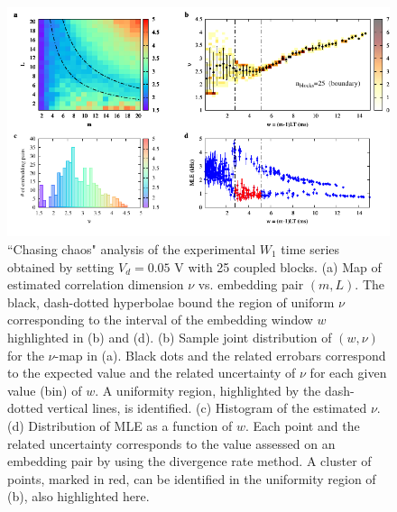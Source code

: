\begin{figure}[H]
    \centering
    \includegraphics[width=\linewidth]{../blocks/25_blocks/edge/2e5_points/plots/chaos_low.pdf}
    \caption{``Chasing chaos" analysis of the experimental $W_1$ time series obtained by setting $V_d=0.05$ V with 25 coupled blocks.
    (a) Map of estimated correlation dimension $\nu$ vs. embedding pair $(m, L)$.
    The black, dash-dotted hyperbolae bound the region of uniform $\nu$ corresponding to the interval of the
    embedding window $w$ highlighted in (b) and (d).
    (b) Sample joint distribution of $(w,\nu)$ for the $\nu$-map in (a).
    Black dots and the related errobars correspond to the expected value and the related uncertainty of $\nu$
    for each given value (bin) of $w$. A uniformity region, highlighted by the dash-dotted vertical lines,
    is identified. (c) Histogram of the estimated $\nu$. (d) Distribution of MLE as a function of $w$. Each point and the related
    uncertainty corresponds to the value assessed on an embedding pair by using the divergence rate method.
    A cluster of points, marked in red, can be identified in the uniformity region of (b), also highlighted here.}
    \label{fig:25 blocks chaos}
\end{figure}

